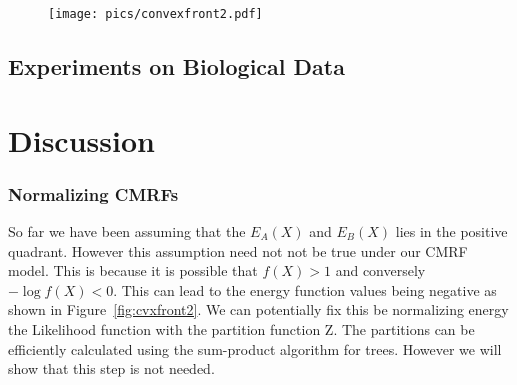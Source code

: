 \documentclass{article}
\begin{document}
\begin{figure}[h!]
    \centering
    \texttt{[image: pics/convexfront2.pdf]}
    \caption{ }
    \label{fig:pareto-sim}
\end{figure}
\pagebreak

\subsection{Experiments on Biological Data}

\section{Discussion}


\subsubsection{Normalizing CMRFs}
So far we have been assuming that the $E_A(X)$ and $E_B(X)$ lies in the positive quadrant. However this assumption need not not be true under our CMRF model. This is because it is possible that $f(X) > 1$ and conversely $-\log f(X) < 0$. This can lead to the energy function values being negative as shown in Figure~\ref{fig:cvxfront2}. We can potentially fix this be normalizing energy the Likelihood function with the partition function Z. The partitions can be efficiently calculated using the sum-product algorithm for trees. However we will show that this step is not needed. 
\end{document}
